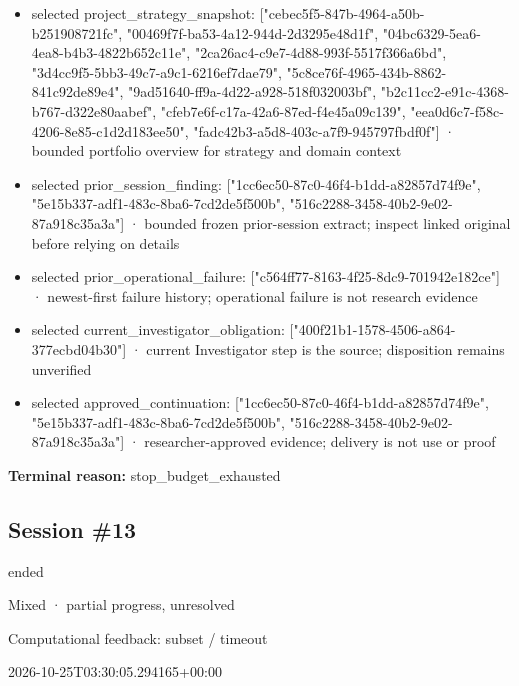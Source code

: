 \documentclass[11pt]{article}
\begin{document}
\begin{itemize}
\item selected project\_strategy\_snapshot: ["cebec5f5-847b-4964-a50b-b251908721fc", "00469f7f-ba53-4a12-944d-2d3295e48d1f", "04bc6329-5ea6-4ea8-b4b3-4822b652c11e", "2ca26ac4-c9e7-4d88-993f-5517f366a6bd", "3d4cc9f5-5bb3-49c7-a9c1-6216ef7dae79", "5c8ce76f-4965-434b-8862-841c92de89e4", "9ad51640-ff9a-4d22-a928-518f032003bf", "b2c11cc2-e91c-4368-b767-d322e80aabef", "cfeb7e6f-c17a-42a6-87ed-f4e45a09c139", "eea0d6c7-f58c-4206-8e85-c1d2d183ee50", "fadc42b3-a5d8-403c-a7f9-945797fbdf0f"] · bounded portfolio overview for strategy and domain context
\item selected prior\_session\_finding: ["1cc6ec50-87c0-46f4-b1dd-a82857d74f9e", "5e15b337-adf1-483c-8ba6-7cd2de5f500b", "516c2288-3458-40b2-9e02-87a918c35a3a"] · bounded frozen prior-session extract; inspect linked original before relying on details
\item selected prior\_operational\_failure: ["c564ff77-8163-4f25-8dc9-701942e182ce"] · newest-first failure history; operational failure is not research evidence
\item selected current\_investigator\_obligation: ["400f21b1-1578-4506-a864-377ecbd04b30"] · current Investigator step is the source; disposition remains unverified
\item selected approved\_continuation: ["1cc6ec50-87c0-46f4-b1dd-a82857d74f9e", "5e15b337-adf1-483c-8ba6-7cd2de5f500b", "516c2288-3458-40b2-9e02-87a918c35a3a"] · researcher-approved evidence; delivery is not use or proof
\end{itemize}
\textbf{Terminal reason:} stop\_budget\_exhausted\par
\subsection{Session \#13}
\begin{description}[style=nextline,font=\normalfont\bfseries,leftmargin=0pt,labelsep=0pt]
\item[Execution status] ended
\item[Outcome] Mixed · partial progress, unresolved
\item[Strategy] Computational feedback: subset / timeout
\item[Started] 2026-10-25T03:30:05.294165+00:00
\end{description}
\end{document}
